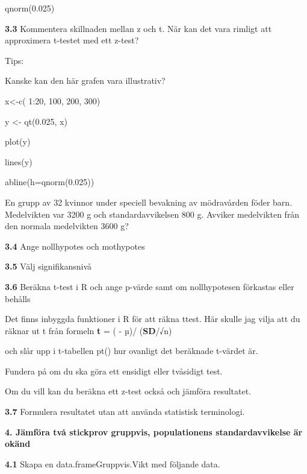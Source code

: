 \documentclass[
  letterpaper,
  DIV=11,
  numbers=noendperiod]{scrartcl}
\begin{document}
qnorm(0.025)

\textbf{3.3} Kommentera skillnaden mellan z och t. När kan det vara
rimligt att approximera t-testet med ett z-test?

Tips:

Kanske kan den här grafen vara illustrativ?

x\textless-c( 1:20, 100, 200, 300)

y \textless- qt(0.025, x)

plot(y)

lines(y)

abline(h=qnorm(0.025))

En grupp av 32 kvinnor under speciell bevakning av mödravården föder
barn. Medelvikten var 3200 g och standardavvikelsen 800 g. Avviker
medelvikten från den normala medelvikten 3600 g?

\textbf{3.4} Ange nollhypotes och mothypotes

\textbf{3.5} Välj signifikansnivå

\textbf{3.6} Beräkna t-test i R och ange p-värde samt om nollhypotesen
förkastas eller behålls

Det finns inbyggda funktioner i R för att räkna ttest. Här skulle jag
vilja att du räknar ut t från formeln \textbf{t} = ( - µ)/
(\textbf{SD}/√n)

och slår upp i t-tabellen pt() hur ovanligt det beräknade t-värdet är.

Fundera på om du ska göra ett ensidigt eller tvåsidigt test.

Om du vill kan du beräkna ett z-test också och jämföra resultatet.

\textbf{3.7} Formulera resultatet utan att använda statistisk
terminologi.

\textbf{4. Jämföra två stickprov gruppvis, populationens
standardavvikelse är okänd}

\textbf{4.1} Skapa en data.frameGruppvis.Vikt med följande data.
\end{document}

